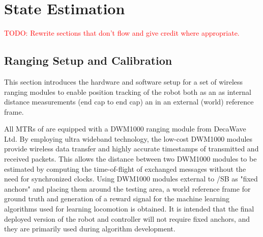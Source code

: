 \chapter{State Estimation}
\label{state_estimation}

\textcolor{red}{TODO: Rewrite sections that don't flow and give credit where appropriate.}

\section{Ranging Setup and Calibration}
\label{ranging}
\label{txt:ranging}
This section introduces the hardware and software setup for a set of wireless ranging modules to enable 
position tracking of the robot both as an as internal distance measurements (end cap to end cap) an in an external (world) reference frame.

All MTRs of \SB{} are equipped with a DWM1000 ranging module from DecaWave Ltd.
By employing ultra wideband technology, the low-cost DWM1000 modules provide wireless data transfer and highly accurate timestamps of transmitted and received packets. 
This allows the distance between two DWM1000 modules to be estimated by computing the time-of-flight of exchanged messages without the need for synchronized clocks.
Using DWM1000 modules external to /SB{} as "fixed anchors" and placing them around the testing area, a world reference frame for
 ground truth and generation of a reward signal for the machine learning algorithms used for learning locomotion is obtained.  
It is intended that the final deployed version of the robot and controller will not require fixed anchors, and they are primarily
used during algorithm development.


